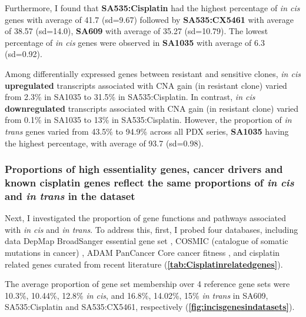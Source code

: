 Furthermore, I found that \textbf{SA535:Cisplatin} had the highest percentage of \textit{in cis} genes with average of 41.7 (sd=9.67) followed by \textbf{SA535:CX5461} with average of 38.57 (sd=14.0), \textbf{SA609} with average of 35.27 (sd=10.79). The lowest percentage of \textit{in cis} genes were observed in \textbf{SA1035} with average of 6.3 (sd=0.92).

Among differentially expressed genes between resistant and sensitive clones, \textit{in cis} \textbf{upregulated} transcripts associated with CNA gain (in resistant clone) varied from 2.3\% in SA1035 to 31.5\% in SA535:Cisplatin. In contrast, \textit{in cis} \textbf{downregulated} transcripts associated with CNA gain (in resistant clone) varied from 0.1\% in SA1035 to 13\% in SA535:Cisplatin. However, the proportion of \textit{in trans} genes varied from 43.5\% to 94.9\% across all PDX series, \textbf{SA1035} having the highest percentage, with average of 93.7 (sd=0.98).












\subsubsection{Proportions of high essentiality genes, cancer drivers and known cisplatin genes reflect the same proportions of \textit{in cis} and \textit{in trans} in the dataset}
Next, I investigated the proportion of gene functions and pathways associated with \textit{in cis} and \textit{in trans}. To address this, first, I probed four databases, including data DepMap BroadSanger essential gene set \cite{dempster2019agreement}, COSMIC (catalogue of somatic mutations in cancer) \cite{forbes2010cosmic}, ADAM PanCancer Core cancer fitness  \cite{behan2019prioritization}, and cisplatin related genes curated from recent literature (\textbf{\autoref{tab:Cisplatinrelatedgenes}}).

The average proportion of gene set membership over 4 reference gene sets were 10.3\%, 10.44\%, 12.8\% \textit{in cis}, and 16.8\%, 14.02\%, 15\% \textit{in trans} in SA609, SA535:Cisplatin and SA535:CX5461, respectively (\textbf{\autoref{fig:incisgenesindatasets}}).

